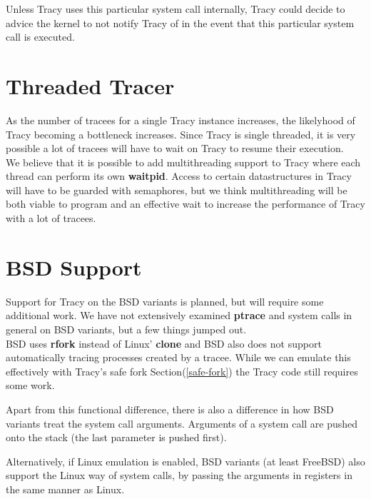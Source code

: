 \documentclass[a4paper, 10pt]{report}
\begin{document}
Unless Tracy uses this particular system call internally, Tracy could decide
to advice the kernel to not notify Tracy of in the event that this particular
system call is executed.


\section{Threaded Tracer}

As the number of tracees for a single Tracy instance increases, the
likelyhood of Tracy becoming a bottleneck increases. Since Tracy is
single threaded, it is very possible a lot of tracees will have to wait
on Tracy to resume their execution. \\

We believe that it is possible to add multithreading support to Tracy where
each thread can perform its own \textbf{waitpid}. Access to certain
datastructures in Tracy will have to be guarded with semaphores, but
we think multithreading will be both viable to program and an effective
wait to increase the performance of Tracy with a lot of tracees.


\section{BSD Support}
\label{bsd-support}

Support for Tracy on the BSD variants is planned, but will require some
additional work. We have not extensively examined \textbf{ptrace} and
system calls in general on BSD variants, but a few things jumped out. \\

BSD uses \textbf{rfork} instead of Linux' \textbf{clone} and BSD also does
not support automatically tracing processes created by a tracee. While
we can emulate this effectively with Tracy's safe fork
Section(\ref{safe-fork}) the Tracy code still requires some work.

Apart from this functional difference, there is also a difference in
how BSD variants treat the system call arguments. Arguments of a system
call are pushed onto the stack (the last parameter is pushed first).
\cite{int80h}

Alternatively, if Linux emulation is enabled, BSD variants (at least FreeBSD)
also support the Linux way of system calls, by passing the arguments in
registers in the same manner as Linux.
\end{document}
